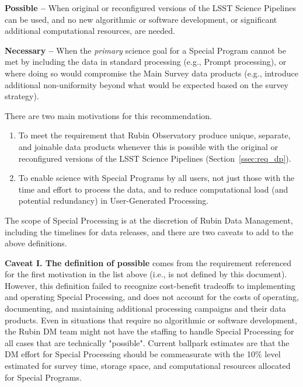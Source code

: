 \textbf{Possible -- } When original or reconfigured versions of the LSST
Science Pipelines can be used, and no new algorithmic or software development,
or significant additional computational resources, are needed.

\textbf{Necessary -- } When the \emph{primary} science goal for a Special Program 
cannot be met by including the data in standard processing (e.g., Prompt processing),
or where doing so would compromise the Main Survey data products (e.g., introduce additional
non-uniformity beyond what would be expected based on the survey strategy).

There are two main motivations for this recommendation.

\begin{enumerate}

\item To meet the requirement that Rubin Observatory produce
unique, separate, and joinable data products whenever this is possible 
with the original or reconfigured versions of the LSST Science Pipelines
(Section~\ref{ssec:req_dp}).

\item To enable science with Special Programs by all users, not just those
with the time and effort to process the data, and to reduce computational
load (and potential redundancy) in User-Generated Processing.

\end{enumerate}

The scope of Special Processing is at the discretion of
Rubin Data Management, including the timelines for data releases,
and there are two caveats to add to the above definitions.

\textbf{Caveat I. The definition of possible} comes from the requirement referenced
for the first motivation in the list above (i.e., is not defined by this document).
However, this definition failed to recognize cost-benefit tradeoffs to implementing
and operating Special Processing, and does not account for the costs of operating,
documenting, and maintaining additional processing campaigns and their data products.
Even in situations that require no algorithmic or software development,
the Rubin DM team might not have the staffing to handle Special Processing
for all cases that are technically "possible".
Current ballpark estimates are that the DM effort for Special Processing
should be commeasurate with the 10\% level estimated for survey time,
storage space, and computational resources allocated for Special Programs.


